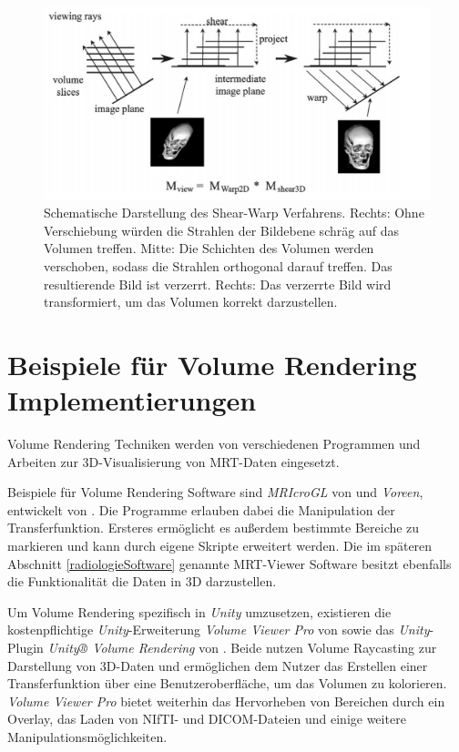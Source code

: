 \begin{figure}[!htb]
	\centering
	\includegraphics[width=0.7\linewidth]{images/shearwarp.png}
	\caption{Schematische Darstellung des Shear-Warp Verfahrens. Rechts: Ohne Verschiebung würden die Strahlen der Bildebene schräg auf das Volumen treffen. Mitte: Die Schichten des Volumen werden verschoben, sodass die Strahlen orthogonal darauf treffen. Das resultierende Bild ist verzerrt. Rechts: Das verzerrte Bild wird transformiert, um das Volumen korrekt darzustellen.}
	\label{img:shearwarp}
\end{figure}
\FloatBarrier

\section{Beispiele für Volume Rendering Implementierungen}
\label{volumeRenderingImplementierung}

Volume Rendering Techniken werden von verschiedenen Programmen und Arbeiten zur 3D-Visualisierung von MRT-Daten eingesetzt.

Beispiele für Volume Rendering Software sind \textit{MRIcroGL} von \cite{MRIcroGL} und \textit{Voreen}, entwickelt von \cite{voreen}. Die Programme erlauben dabei die Manipulation der Transferfunktion. Ersteres ermöglicht es außerdem bestimmte Bereiche zu markieren und kann durch eigene Skripte erweitert werden.
Die im späteren Abschnitt \ref{radiologieSoftware} genannte MRT-Viewer Software besitzt ebenfalls die Funktionalität die Daten in 3D darzustellen.

Um Volume Rendering spezifisch in \textit{Unity} umzusetzen, existieren die kostenpflichtige \textit{Unity}-Erweiterung \textit{Volume Viewer Pro} von \cite{volumeViewerPro} sowie das \textit{Unity}-Plugin \textit{Unity® Volume Rendering} von \cite{volumeRenderingUnity}. Beide nutzen Volume Raycasting zur Darstellung von 3D-Daten und ermöglichen dem Nutzer das Erstellen einer Transferfunktion über eine Benutzeroberfläche, um das Volumen zu kolorieren. \textit{Volume Viewer Pro} bietet weiterhin das Hervorheben von Bereichen durch ein Overlay, das Laden von NIfTI- und DICOM-Dateien und einige weitere Manipulationsmöglichkeiten. 

